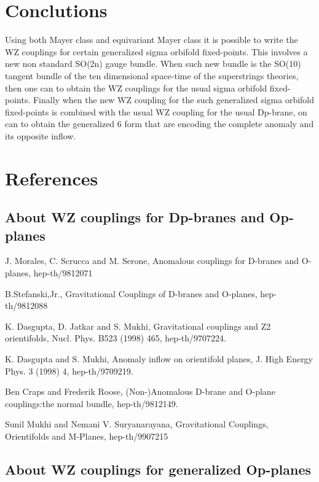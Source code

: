 \documentclass[a4paper,a4paper]{article}
\begin{document}
 
\section{Conclutions}

Using both Mayer class and equivariant Mayer class it is possible to write the WZ couplings for certain generalized sigma orbifold fixed-points.  This involves a new non standard SO(2n) gauge bundle.  When such new bundle is the SO(10) tangent bundle of the ten dimensional space-time of the superstrings theories, then one can to obtain the WZ couplings for the usual 
sigma orbifold fixed-points. Finally when the new WZ coupling for the such generalized sigma orbifold fixed-points is combined with the usual WZ coupling for the usual Dp-brane, on can to obtain the generalized 6 form that are encoding the complete anomaly and its opposite inflow.




\section{References}


\subsection{About WZ couplings  for Dp-branes and Op-planes}
\setlength{\baselineskip}{20pt}
J. Morales, C. Scrucca and M. Serone, Anomalous couplings for D-branes and O-planes, hep-th/9812071


B.Stefanski,Jr., Gravitational Couplings of D-branes and O-planes, hep-th/9812088

K. Dasgupta, D. Jatkar and S. Mukhi, Gravitational couplings and Z2 orientifolds, Nucl. Phys. B523 (1998) 465, hep-th/9707224.

K. Dasgupta and S. Mukhi, Anomaly inflow on orientifold planes, J. High Energy Phys. 3 (1998) 4, hep-th/9709219.

Ben Craps and Frederik Roose, (Non-)Anomalous D-brane and O-plane couplings:the normal bundle,  hep-th/9812149.

Sunil Mukhi and Nemani V. Suryanarayana,  Gravitational Couplings, Orientifolds and M-Planes,  hep-th/9907215

\subsection{About WZ couplings  for generalized Op-planes}
\setlength{\baselineskip}{20pt}
\end{document}
